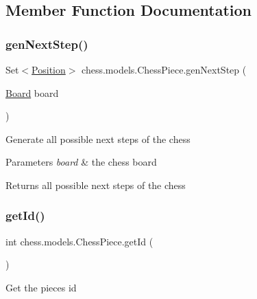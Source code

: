 \subsection{Member Function Documentation}
\mbox{\label{classchess_1_1models_1_1_chess_piece_afd359313e83bdef860f9f8236435522f}} 
\subsubsection{\texorpdfstring{gen\+Next\+Step()}{genNextStep()}}
{\footnotesize\ttfamily Set$<$\mbox{\hyperlink{classchess_1_1models_1_1_position}{Position}}$>$ chess.\+models.\+Chess\+Piece.\+gen\+Next\+Step (\begin{DoxyParamCaption}\item[{\mbox{\hyperlink{classchess_1_1models_1_1_board}{Board}}}]{board }\end{DoxyParamCaption})}

Generate all possible next steps of the chess


\begin{DoxyParams}{Parameters}
{\em board} & the chess board \\
\hline
\end{DoxyParams}
\begin{DoxyReturn}{Returns}
all possible next steps of the chess 
\end{DoxyReturn}
\mbox{\label{classchess_1_1models_1_1_chess_piece_aaa0ccd6a8327325fa05f7654669516ae}} 
\subsubsection{\texorpdfstring{get\+Id()}{getId()}}
{\footnotesize\ttfamily int chess.\+models.\+Chess\+Piece.\+get\+Id (\begin{DoxyParamCaption}{ }\end{DoxyParamCaption})}

Get the piece\textquotesingle{}s id

